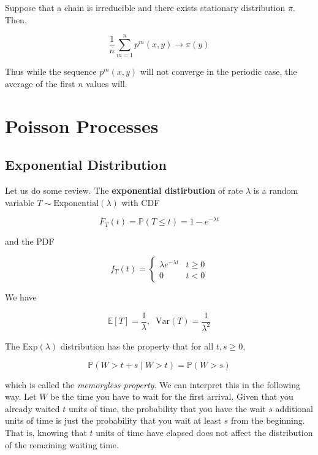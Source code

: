 \documentclass{article}
\begin{document}
    \begin{theorem}
      Suppose that a chain is irreducible and there exists stationary distribution $\pi$. Then, 

        \[\frac{1}{n} \sum_{m=1}^n p^m (x, y) \rightarrow \pi(y)\]

      Thus while the sequence $p^m (x, y)$ will not converge in the periodic case, the average of the first $n$ values will. 
    \end{theorem}

\section{Poisson Processes}

  \subsection{Exponential Distribution}

    Let us do some review. The \textbf{exponential distirbution} of rate $\lambda$ is a random variable $T \sim \mathrm{Exponential}(\lambda)$ with CDF 

      \[F_T (t) = \mathbb{P}(T \leq t) = 1 - e^{-\lambda t}\]

    and the PDF 

      \[f_T (t) = \begin{cases} \lambda e^{-\lambda t} & t \geq 0 \\ 0 & t < 0 \end{cases}\]

    We have 

      \[\mathbb{E}[T] = \frac{1}{\lambda}, \;\; \mathrm{Var}(T) = \frac{1}{\lambda^2}\]

    \begin{lemma}
      The Exp$(\lambda)$ distribution has the property that for all $t, s \geq 0$, 

        \[\mathbb{P}(W > t + s \; | \; W > t) = \mathbb{P}(W > s)\]

      which is called the \textit{memoryless property}. We can interpret this in the following way. Let $W$ be the time you have to wait for the first arrival. Given that you already waited $t$ units of time, the probability that you have the wait $s$ additional units of time is just the probability that you wait at least $s$ from the beginning. That is, knowing that $t$ units of time have elapsed does not affect the distribution of the remaining waiting time. 
    \end{lemma}
\end{document}
